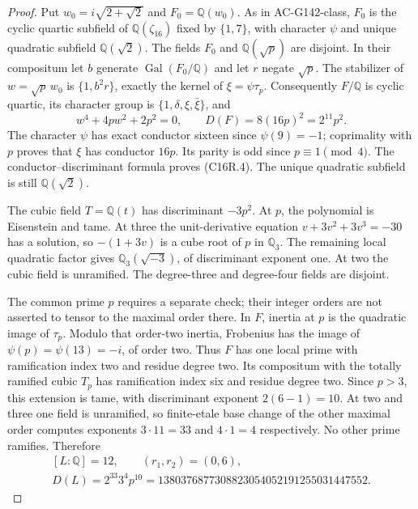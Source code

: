 \begin{proof}
Put $w_0=i\sqrt{2+\sqrt2}$ and $F_0=\mathbb Q(w_0)$.
As in AC-G142-class, $F_0$ is the cyclic quartic subfield of
$\mathbb Q(\zeta_{16})$ fixed by $\{1,7\}$, with character
$\psi$ and unique quadratic subfield $\mathbb Q(\sqrt2)$.
The fields $F_0$ and $\mathbb Q(\sqrt p)$ are disjoint.
In their compositum let $b$ generate $\operatorname{Gal}(F_0/\mathbb Q)$
and let $r$ negate $\sqrt p$.  The stabilizer of $w=\sqrt p\,w_0$
is $\{1,b^2r\}$, exactly the kernel of $\xi=\psi\tau_p$.
Consequently $F/\mathbb Q$ is cyclic quartic, its character group is
$\{1,\delta,\xi,\bar\xi\}$, and
\[
 w^4+4pw^2+2p^2=0,\qquad
 D(F)=8(16p)^2=2^{11}p^2.
 \tag{C16R.4}
\]
The character $\psi$ has exact conductor sixteen since
$\psi(9)=-1$; coprimality with $p$ proves that $\xi$ has
conductor $16p$.  Its parity is odd since $p\equiv1\pmod4$.
The conductor--discriminant formula proves (C16R.4).
The unique quadratic subfield is still $\mathbb Q(\sqrt2)$.

The cubic field $T=\mathbb Q(t)$ has discriminant $-3p^2$.
At $p$, the polynomial is Eisenstein and tame.  At three the
unit-derivative equation $v+3v^2+3v^3=-30$ has a solution,
so $-(1+3v)$ is a cube root of $p$ in $\mathbb Q_3$.
The remaining local quadratic factor gives
$\mathbb Q_3(\sqrt{-3})$, of discriminant exponent one.
At two the cubic field is unramified.  The degree-three and
degree-four fields are disjoint.

The common prime $p$ requires a separate check; their integer
orders are not asserted to tensor to the maximal order there.
In $F$, inertia at $p$ is the quadratic image of $\tau_p$.
Modulo that order-two inertia, Frobenius has the image of
$\psi(p)=\psi(13)=-i$, of order two.  Thus $F$ has one local
prime with ramification index two and residue degree two.
Its compositum with the totally ramified cubic $T_p$ has
ramification index six and residue degree two.  Since $p>3$,
this extension is tame, with discriminant exponent
$2(6-1)=10$.  At two and three one field is unramified, so
finite-etale base change of the other maximal order computes
exponents $3\cdot11=33$ and $4\cdot1=4$ respectively.
No other prime ramifies.  Therefore
\[
 \begin{gathered}
 [L:\mathbb Q]=12,\qquad(r_1,r_2)=(0,6),\\
 D(L)=2^{33}3^4p^{10}=1380376877308823054052191255031447552.
 \end{gathered}
 \tag{C16R.5}
\]


\end{proof}
